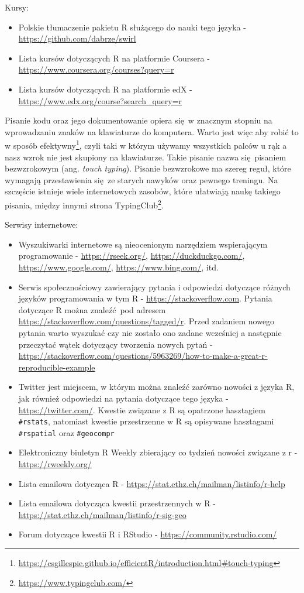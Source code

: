 \documentclass[paper=6in:9in,pagesize=pdftex,headinclude=on,footinclude=on,10pt]{scrbook}
\DeclareRobustCommand{\href}[2]{#2\footnote{\url{#1}}}
\providecommand{\tightlist}{%
  \setlength{\itemsep}{0pt}\setlength{\parskip}{0pt}}
\let\BeginKnitrBlock\begin \let\EndKnitrBlock\end
\begin{document}
Kursy:

\begin{itemize}
\tightlist
\item
  Polskie tłumaczenie pakietu R służącego do nauki tego języka - \url{https://github.com/dabrze/swirl}
\item
  Lista kursów dotyczących R na platformie Coursera - \url{https://www.coursera.org/courses?query=r}
\item
  Lista kursów dotyczących R na platformie edX - \url{https://www.edx.org/course?search_query=r}
\end{itemize}

\BeginKnitrBlock{rmdinfo}
Pisanie kodu oraz jego dokumentowanie opiera się~w znacznym stopniu na wprowadzaniu znaków na klawiaturze do komputera.
Warto jest więc aby robić to w sposób \href{https://csgillespie.github.io/efficientR/introduction.html\#touch-typing}{efektywny}, czyli taki w którym używamy wszystkich palców u rąk a nasz wzrok nie jest skupiony na klawiaturze.
Takie pisanie nazwa się~pisaniem bezwzrokowym (ang. \emph{touch typing}).
Pisanie bezwzrokowe ma szereg reguł, które wymagają przestawienia się~ze starych nawyków oraz pewnego treningu.
Na szczęście istnieje wiele internetowych zasobów, które ułatwiają naukę takiego pisania, między innymi strona \href{https://www.typingclub.com/}{TypingClub}.
\EndKnitrBlock{rmdinfo}

Serwisy internetowe:

\begin{itemize}
\tightlist
\item
  Wyszukiwarki internetowe są nieocenionym narzędziem wspierającym programowanie - \url{https://rseek.org/}, \url{https://duckduckgo.com/}, \url{https://www.google.com/}, \url{https://www.bing.com/}, itd.
\item
  Serwis społecznościowy zawierający pytania i odpowiedzi dotyczące różnych języków programowania w tym R - \url{https://stackoverflow.com}.
  Pytania dotyczące R można znaleźć~pod adresem \url{https://stackoverflow.com/questions/tagged/r}.
  Przed zadaniem nowego pytania warto wyszukać czy nie zostało ono zadane wcześniej a następnie przeczytać wątek dotyczący tworzenia nowych pytań - \url{https://stackoverflow.com/questions/5963269/how-to-make-a-great-r-reproducible-example}
\item
  Twitter jest miejscem, w którym można znaleźć zarówno nowości z języka R, jak również odpowiedzi na pytania dotyczące tego języka - \url{https://twitter.com/}.
  Kwestie związane z R są opatrzone hasztagiem \texttt{\#rstats}, natomiast kwestie przestrzenne w R są opisywane hasztagami \texttt{\#rspatial} oraz \texttt{\#geocompr}
\item
  Elektroniczny biuletyn R Weekly zbierający co tydzień nowości związane z r - \url{https://rweekly.org/}
\item
  Lista emailowa dotycząca R - \url{https://stat.ethz.ch/mailman/listinfo/r-help}
\item
  Lista emailowa dotycząca kwestii przestrzennych w R - \url{https://stat.ethz.ch/mailman/listinfo/r-sig-geo}
\item
  Forum dotyczące kwestii R i RStudio - \url{https://community.rstudio.com/}
\end{itemize}
\end{document}
